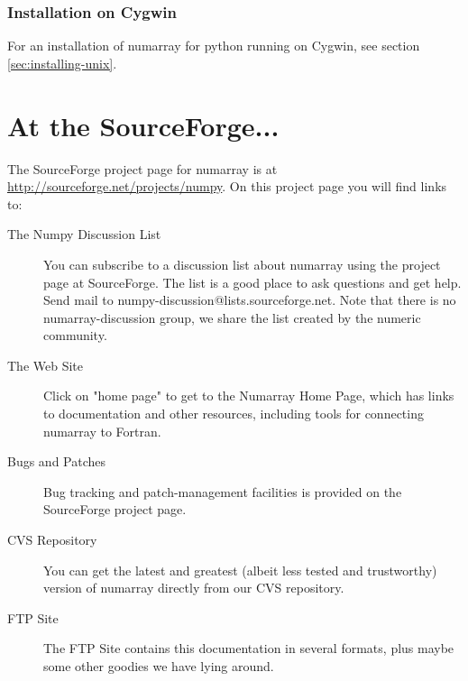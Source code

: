 \subsubsection{Installation on Cygwin}

For an installation of numarray for python running on Cygwin, see section
\ref{sec:installing-unix}.



\section{At the SourceForge...}
\label{sec:at-sourceforge}

The SourceForge project page for numarray is at
\url{http://sourceforge.net/projects/numpy}. On this project page you will find
links to:
\begin{description}
\item[The Numpy Discussion List] You can subscribe to a discussion list about
   numarray using the project page at SourceForge. The list is a good place to
   ask questions and get help. Send mail to
   numpy-discussion@lists.sourceforge.net.  Note that there is no
   numarray-discussion group, we share the list created by the numeric community.

\item[The Web Site] Click on "home page" to get to the Numarray Home Page,
   which has links to documentation and other resources, including tools for
   connecting numarray to Fortran.
\item[Bugs and Patches] Bug tracking and patch-management facilities is
   provided on the SourceForge project page.
\item[CVS Repository] You can get the latest and greatest (albeit less tested
   and trustworthy) version of numarray directly from our CVS repository.
\item[FTP Site] The FTP Site contains this documentation in several formats,
   plus maybe some other goodies we have lying around.
\end{description}



